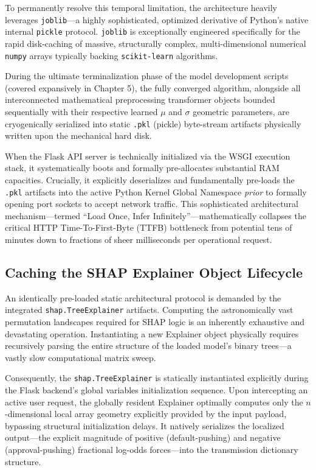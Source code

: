 To permanently resolve this temporal limitation, the architecture
heavily leverages \texttt{joblib}---a highly sophisticated, optimized
derivative of Python's native internal \texttt{pickle} protocol.
\texttt{joblib} is exceptionally engineered specifically for the rapid
disk-caching of massive, structurally complex, multi-dimensional
numerical \texttt{numpy} arrays typically backing \texttt{scikit-learn}
algorithms.

During the ultimate terminalization phase of the model development
scripts (covered expansively in Chapter 5), the fully converged
algorithm, alongside all interconnected mathematical preprocessing
transformer objects bounded sequentially with their respective learned
\(\mu\) and \(\sigma\) geometric parameters, are cryogenically
serialized into static \texttt{.pkl} (pickle) byte-stream artifacts
physically written upon the mechanical hard disk.

When the Flask API server is technically initialized via the WSGI
execution stack, it systematically boots and formally pre-allocates
substantial RAM capacities. Crucially, it explicitly deserializes and
fundamentally pre-loads the \texttt{.pkl} artifacts into the active
Python Kernel Global Namespace \emph{prior} to formally opening port
sockets to accept network traffic. This sophisticated architectural
mechanism---termed ``Load Once, Infer Infinitely''---mathematically
collapses the critical HTTP Time-To-First-Byte (TTFB) bottleneck from
potential tens of minutes down to fractions of sheer milliseconds per
operational request.

\hypertarget{caching-the-shap-explainer-object-lifecycle}{%
\subsection{Caching the SHAP Explainer Object
Lifecycle}\label{caching-the-shap-explainer-object-lifecycle}}

An identically pre-loaded static architectural protocol is demanded by
the integrated \texttt{shap.TreeExplainer} artifacts. Computing the
astronomically vast permutation landscapes required for SHAP logic is an
inherently exhaustive and devastating operation. Instantiating a new
Explainer object physically requires recursively parsing the entire
structure of the loaded model's binary trees---a vastly slow
computational matrix sweep.

Consequently, the \texttt{shap.TreeExplainer} is statically instantiated
explicitly during the Flask backend's global variables initialization
sequence. Upon intercepting an active user request, the globally
resident Explainer optimally computes only the \(n\)-dimensional local
array geometry explicitly provided by the input payload, bypassing
structural initialization delays. It natively serializes the localized
output---the explicit magnitude of positive (default-pushing) and
negative (approval-pushing) fractional log-odds forces---into the
transmission dictionary structure.

